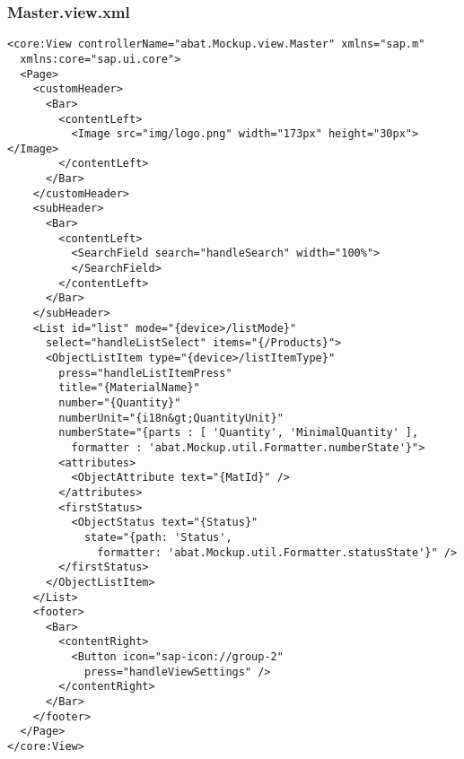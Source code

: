 \newpage
\subsubsection*{Master.view.xml}
\begin{lstlisting}[language=HTML5, label=lst:Master.view.xml]
<core:View controllerName="abat.Mockup.view.Master" xmlns="sap.m"
  xmlns:core="sap.ui.core">
  <Page>
    <customHeader>
      <Bar>
        <contentLeft>
          <Image src="img/logo.png" width="173px" height="30px"></Image>
        </contentLeft>
      </Bar>
    </customHeader>
    <subHeader>
      <Bar>
        <contentLeft>
          <SearchField search="handleSearch" width="100%">
          </SearchField>
        </contentLeft>
      </Bar>
    </subHeader>
    <List id="list" mode="{device>/listMode}"
      select="handleListSelect" items="{/Products}">
      <ObjectListItem type="{device>/listItemType}"
        press="handleListItemPress"
        title="{MaterialName}"
        number="{Quantity}"
        numberUnit="{i18n&gt;QuantityUnit}"
        numberState="{parts : [ 'Quantity', 'MinimalQuantity' ],
          formatter : 'abat.Mockup.util.Formatter.numberState'}">
        <attributes>
          <ObjectAttribute text="{MatId}" />
        </attributes>
        <firstStatus>
          <ObjectStatus text="{Status}"
            state="{path: 'Status',
              formatter: 'abat.Mockup.util.Formatter.statusState'}" />
        </firstStatus>
      </ObjectListItem>
    </List>
    <footer>
      <Bar>
        <contentRight>
          <Button icon="sap-icon://group-2"
            press="handleViewSettings" />
        </contentRight>
      </Bar>
    </footer>
  </Page>
</core:View>
\end{lstlisting}

\newpage
